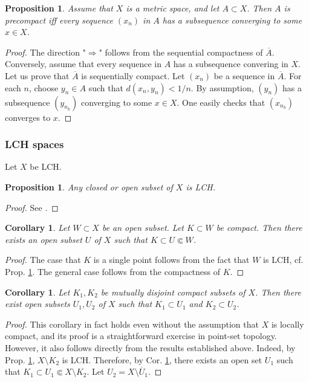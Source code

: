 \documentclass[12pt,b5paper,notitlepage]{article}
\theoremstyle{definition}
\theoremstyle{plain}
\newtheorem{pp}[df]{Proposition}
\newtheorem{co}[df]{Corollary}
\newcommand{\ovl}{\overline}
\numberwithin{equation}{section}
\begin{document}
\begin{pp}\label{lb180}
Assume that $X$ is a metric space, and let $A\subset X$. Then $A$ is precompact iff every sequence $(x_n)$ in $A$ has a subsequence converging to some $x\in X$. 
\end{pp}

\begin{proof}
The direction "$\Rightarrow$" follows from the sequential compactness of $\ovl A$. Conversely, assume that every sequence in $A$ has a subsequence convering in $X$. Let us prove that $\ovl A$ is sequentially compact. Let $(x_n)$ be a sequence in $\ovl A$. For each $n$, choose $y_n\in A$ such that $d(x_n,y_n)<1/n$. By assumption, $(y_n)$ has a subsequence $(y_{n_k})$ converging to some $x\in X$. One easily checks that $(x_{n_k})$ converges to $x$.
\end{proof}




\subsubsection{LCH spaces}

Let $X$ be LCH.

\begin{pp}\label{lb3}
Any closed or open subset of $X$ is LCH.
\end{pp}

\begin{proof}
See \cite[Subsec. 8.6.2]{Gui-A}.
\end{proof}

\begin{co}\label{lb54}
Let $W\subset X$ be an open subset. Let $K\subset W$ be compact. Then there exists an open subset $U$ of $X$ such that $K\subset U\Subset W$. 
\end{co}
\begin{proof}
The case that $K$ is a single point follows from the fact that $W$ is LCH, cf. Prop. \ref{lb3}. The general case follows from the compactness of $K$.
\end{proof}

\begin{co}\label{lb102}
Let $K_1,K_2$ be mutually disjoint compact subsets of $X$. Then there exist open subsets $U_1,U_2$ of $X$ such that $K_1\subset U_1$ and $K_2\subset U_2$.
\end{co}

\begin{proof}
This corollary in fact holds even without the assumption that $X$ is locally compact, and its proof is a straightforward exercise in point-set topology. However, it also follows directly from the results established above. Indeed, by Prop. \ref{lb3}, $X\setminus K_2$ is LCH. Therefore, by Cor. \ref{lb54}, there exists an open set $U_1$ such that $K_1\subset U_1\Subset X\setminus K_2$. Let $U_2=X\setminus\ovl U_1$.
\end{proof}
\end{document}
